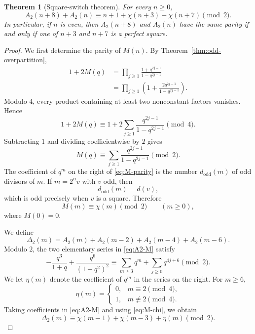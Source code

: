 \documentclass[11pt]{article}
\newtheorem{theorem}{Theorem}[section]
\theoremstyle{definition}
\theoremstyle{remark}
\begin{document}
\begin{theorem}[Square-switch theorem]\label{thm:square-switch}
For every $n\geq0$,
\begin{equation}\label{eq:square-switch}
 A_2(n+8)+A_2(n)
 \equiv n+1+\chi(n+3)+\chi(n+7)\pmod2.
\end{equation}
In particular, if $n$ is even, then $A_2(n+8)$ and $A_2(n)$ have the same parity if and only if one of $n+3$ and $n+7$ is a perfect square.
\end{theorem}

\begin{proof}
We first determine the parity of $M(n)$.  By Theorem~\ref{thm:odd-overpartition},
\begin{align*}
 1+2M(q)
 &=\prod_{j\geq1}
 \frac{1+q^{2j-1}}{1-q^{2j-1}}\\
 &=\prod_{j\geq1}
 \left(1+\frac{2q^{2j-1}}{1-q^{2j-1}}\right).
\end{align*}
Modulo $4$, every product containing at least two nonconstant factors vanishes.  Hence
\[
 1+2M(q)
 \equiv1+2\sum_{j\geq1}
 \frac{q^{2j-1}}{1-q^{2j-1}}\pmod4.
\]
Subtracting $1$ and dividing coefficientwise by $2$ gives
\begin{equation}\label{eq:M-parity}
 M(q)\equiv\sum_{j\geq1}
 \frac{q^{2j-1}}{1-q^{2j-1}}\pmod2.
\end{equation}
The coefficient of $q^m$ on the right of \eqref{eq:M-parity} is the number $d_{\mathrm{odd}}(m)$ of odd divisors of $m$.  If $m=2^\alpha v$ with $v$ odd, then
\[
 d_{\mathrm{odd}}(m)=d(v),
\]
which is odd precisely when $v$ is a square.  Therefore
\begin{equation}\label{eq:M-chi}
 M(m)\equiv\chi(m)\pmod2
 \qquad(m\geq0),
\end{equation}
where $M(0)=0$.

We define
\[
 \Delta_2(m)=A_2(m)+A_2(m-2)+A_2(m-4)+A_2(m-6).
\]
Modulo $2$, the two elementary series in \eqref{eq:A2-M} satisfy
\[
 -\frac{q^3}{1+q}+\frac{q^6}{(1-q^2)^2}
 \equiv\sum_{m\geq3}q^m+\sum_{j\geq0}q^{4j+6}\pmod2.
\]
We let $\eta(m)$ denote the coefficient of $q^m$ in the series on the right.  For $m\geq6$,
\begin{equation}\label{eq:eta}
 \eta(m)=
 \begin{cases}
 0,&m\equiv2\pmod4,\\
 1,&m\not\equiv2\pmod4.
 \end{cases}
\end{equation}
Taking coefficients in \eqref{eq:A2-M} and using \eqref{eq:M-chi}, we obtain
\begin{equation}\label{eq:Delta-parity}
 \Delta_2(m)
 \equiv\chi(m-1)+\chi(m-3)+\eta(m)\pmod2.
\end{equation}


\end{proof}
\end{document}
